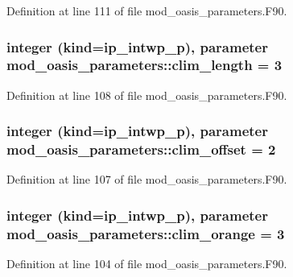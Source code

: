 Definition at line 111 of file mod\+\_\+oasis\+\_\+parameters.\+F90.

\hypertarget{classmod__oasis__parameters_a984896e821cbbb8c4a91e86ff19d54de}{
\subsubsection[{clim\+\_\+length}]{\setlength{\rightskip}{0pt plus 5cm}integer (kind=ip\+\_\+intwp\+\_\+p), parameter mod\+\_\+oasis\+\_\+parameters\+::clim\+\_\+length = 3}}\label{classmod__oasis__parameters_a984896e821cbbb8c4a91e86ff19d54de}


Definition at line 108 of file mod\+\_\+oasis\+\_\+parameters.\+F90.

\hypertarget{classmod__oasis__parameters_a4cd07733eaf5d8c8148986c0c4217772}{
\subsubsection[{clim\+\_\+offset}]{\setlength{\rightskip}{0pt plus 5cm}integer (kind=ip\+\_\+intwp\+\_\+p), parameter mod\+\_\+oasis\+\_\+parameters\+::clim\+\_\+offset = 2}}\label{classmod__oasis__parameters_a4cd07733eaf5d8c8148986c0c4217772}


Definition at line 107 of file mod\+\_\+oasis\+\_\+parameters.\+F90.

\hypertarget{classmod__oasis__parameters_a17c74cc8141b595e448588b1add0f6bf}{
\subsubsection[{clim\+\_\+orange}]{\setlength{\rightskip}{0pt plus 5cm}integer (kind=ip\+\_\+intwp\+\_\+p), parameter mod\+\_\+oasis\+\_\+parameters\+::clim\+\_\+orange = 3}}\label{classmod__oasis__parameters_a17c74cc8141b595e448588b1add0f6bf}


Definition at line 104 of file mod\+\_\+oasis\+\_\+parameters.\+F90.

